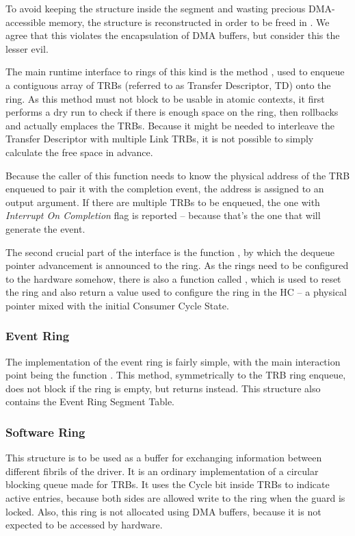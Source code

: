 To avoid keeping the  structure inside the segment and
wasting precious DMA-accessible memory, the structure is reconstructed in order
to be freed in . We agree that this violates the
encapsulation of DMA buffers, but consider this the lesser evil.

The main runtime interface to rings of this kind is the method
, used to enqueue a contiguous array of
TRBs (referred to as Transfer Descriptor, TD) onto the ring. As this method
must not block to be usable in atomic contexts, it first performs a dry run to
check if there is enough space on the ring, then rollbacks and actually
emplaces the TRBs. Because it might be needed to interleave the Transfer
Descriptor with multiple Link TRBs, it is not possible to simply calculate the
free space in advance.

Because the caller of this function needs to know the physical address of the
TRB enqueued to pair it with the completion event, the address is assigned to
an output argument. If there are multiple TRBs to be enqueued, the one with
\emph{Interrupt On Completion} flag is reported -- because that's the one that
will generate the event.

The second crucial part of the interface is the function
, by which the dequeue pointer advancement is
announced to the ring. As the rings need to be configured to the hardware
somehow, there is also a function called
, which is used to reset the ring and
also return a value used to configure the ring in the HC -- a physical pointer
mixed with the initial Consumer Cycle State.

\subsubsection{Event Ring}

The implementation of the event ring is fairly simple, with the main
interaction point being the function . This
method, symmetrically to the TRB ring enqueue, does not block if the ring is
empty, but returns  instead. This structure also contains the
Event Ring Segment Table.

\subsubsection{Software Ring}

This structure is to be used as a buffer for exchanging information between
different fibrils of the driver. It is an ordinary implementation of a circular
blocking queue made for TRBs. It uses the Cycle bit inside TRBs to indicate
active entries, because both sides are allowed write to the ring when the guard
is locked. Also, this ring is not allocated using DMA buffers, because it is
not expected to be accessed by hardware.
